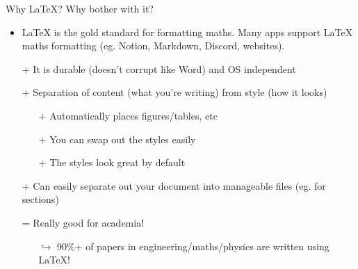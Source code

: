 \documentclass{beamer}
\begin{document}
\begin{frame}[fragile]{Why \LaTeX{}? Why bother with it?}
    \begin{itemize}
        \item \LaTeX{} is the gold standard for formatting maths. Many apps support LaTeX maths formatting (eg. Notion, Markdown, Discord, websites).
        \item[+] It is durable (doesn't corrupt like Word) and OS independent
        \item[+] Separation of content (what you're writing) from style (how it looks)
        \begin{itemize}
            \item[+] Automatically places figures/tables, etc
            \item[+] You can swap out the styles easily
            \item[+] The styles look great by default
        \end{itemize}
        \item[+] Can easily separate out your document into manageable files (eg. for sections) 
        \item[=] Really good for academia!
        \begin{itemize} 
            \item[$\hookrightarrow{}$] 90\%+ of papers in engineering/maths/physics are written using LaTeX!
        \end{itemize} 
    
    \end{itemize}
\end{frame}
\end{document}
